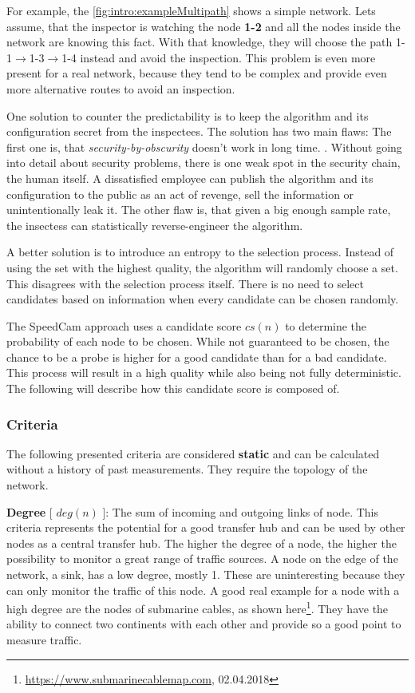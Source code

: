 \documentclass[thesis.tex]{subfiles}
\begin{document}
For example, the \autoref{fig:intro:exampleMultipath} shows a simple network. Lets assume, that the inspector is watching the node \textbf{1-2} and all the nodes inside the network are knowing this fact. With that knowledge, they will choose the path 1-1$\rightarrow$1-3$\rightarrow$1-4 instead and avoid the inspection. This problem is even more present for a real network, because they tend to be complex and provide even more alternative routes to avoid an inspection.

One solution to counter the predictability is to keep the algorithm and its configuration secret from the inspectees. The solution has two main flaws: The first one is, that \textit{security-by-obscurity} doesn't work in long time. . Without going into detail about security problems, there is one weak spot in the security chain, the human itself. A dissatisfied employee can publish the algorithm and its configuration to the public as an act of revenge, sell the information or unintentionally leak it. The other flaw is, that given a big enough sample rate, the insectess can statistically reverse-engineer the algorithm. 

A better solution is to introduce an entropy to the selection process. Instead of using the set with the highest quality, the algorithm will randomly choose a set. This disagrees with the selection process itself. There is no need to select candidates based on information when every candidate can be chosen randomly.

The SpeedCam approach uses a candidate score $cs(n)$ to determine the probability of each node to be chosen. While not guaranteed to be chosen, the chance to be a probe is higher for a good candidate than for a bad candidate. This process will result in a high quality while also being not fully deterministic. The following will describe how this candidate score is composed of.

\subsubsection{Criteria}
The following presented criteria are considered \textbf{static} and can be calculated without a history of past measurements. They require the topology of the network.

\textbf{Degree} [ $deg(n)$ ]: The sum of incoming and outgoing links of node. This criteria represents the potential for a good transfer hub and can be used by other nodes as a central transfer hub. The higher the degree of a node, the higher the possibility to monitor a great range of traffic sources. A node on the edge of the network, a sink, has a low degree, mostly 1. These are uninteresting because they can only monitor the traffic of this node. A good real example for a node with a high degree are the nodes of submarine cables, as shown here\footnote{\url{https://www.submarinecablemap.com}, 02.04.2018}. They have the ability to connect two continents with each other and provide so a good point to measure traffic.
\end{document}
